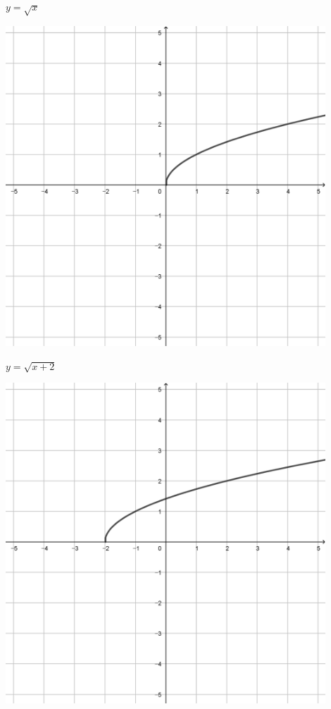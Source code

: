 \documentclass[a4paper]{oblivoir}
\begin{document}
\clearpage
\begin{minipage}{0.45\textwidth}\centering
\(y=\sqrt x\)
\par\bigskip\includegraphics[width=0.9\textwidth]{img/24-1}
\end{minipage}
\begin{minipage}{0.45\textwidth}\centering
\(y=\sqrt{x+2}\)
\par\bigskip\includegraphics[width=0.9\textwidth]{img/24-2}
\end{minipage}\bigskip\bigskip\par
\end{document}

